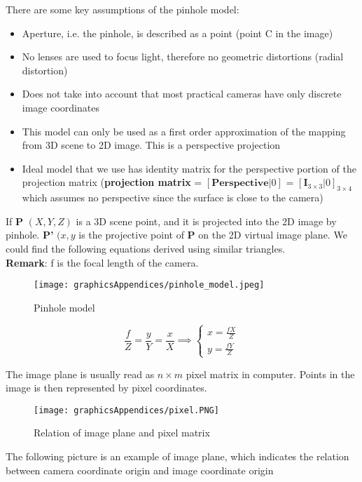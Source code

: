 There are some key assumptions of the pinhole model:  
\begin{itemize}
    \item Aperture, i.e. the pinhole, is described as a point (point C in the image)
    \item No lenses are used to focus light, therefore no geometric distortions (radial distortion)
    \item Does not take into account that most practical cameras have only discrete image coordinates
    \item This model can only be used as a first order approximation of the mapping from 3D scene to 2D image. This is a perspective projection
    \item Ideal model that we use has identity matrix for the perspective portion of the projection matrix (\textbf{projection matrix} = $[\textbf{Perspective} | 0]$ = $[\textbf{I}_{3 \times 3} | 0]_{3 \times 4}$ which assumes no perspective since the surface is close to the camera)
\end{itemize}

If \textbf{P} $(X, Y, Z)$ is a 3D scene point, and it is projected into the 2D image by pinhole. \textbf{P'} $(x, y$ is the projective point of \textbf{P} on the 2D virtual image plane. We could find the following equations derived using similar triangles.  \\
\textbf{Remark}: f is the focal length of the camera.
\begin{figure}[H]
\centering
\texttt{[image: graphicsAppendices/pinhole\_model.jpeg]}
\caption{Pinhole model}
\label{fig:pinholeModel}
\end{figure}
\begin{equation}
    \frac{f}{Z} = \frac{y}{Y} = \frac{x}{X} \implies \begin{cases} x = \frac{fX}{Z} \\ y=\frac{fY}{Z}\end{cases}
    \label{eq:relationCameraImage}
\end{equation}

The image plane is usually read as $n \times m$ pixel matrix in computer. Points in the image is then represented by pixel coordinates.
\begin{figure}[H]
\centering
\texttt{[image: graphicsAppendices/pixel.PNG]}
\caption{Relation of image plane and pixel matrix}
\label{fig:pixelImage}
\end{figure}

The following picture is an example of image plane, which indicates the relation between camera coordinate origin and image coordinate origin

